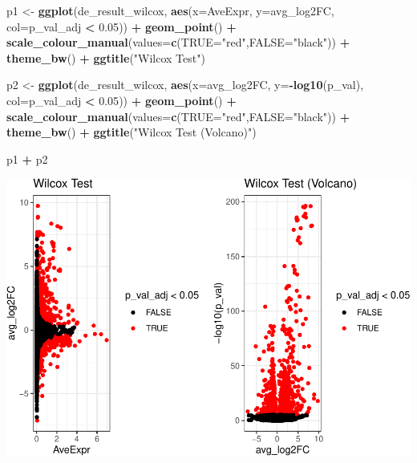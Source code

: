 \documentclass[
]{book}
\newenvironment{Shaded}{\begin{snugshade}}{\end{snugshade}}
\newcommand{\AttributeTok}[1]{\textcolor[rgb]{0.13,0.29,0.53}{#1}}
\newcommand{\FloatTok}[1]{\textcolor[rgb]{0.00,0.00,0.81}{#1}}
\newcommand{\FunctionTok}[1]{\textcolor[rgb]{0.13,0.29,0.53}{\textbf{#1}}}
\newcommand{\NormalTok}[1]{#1}
\newcommand{\OtherTok}[1]{\textcolor[rgb]{0.56,0.35,0.01}{#1}}
\newcommand{\SpecialCharTok}[1]{\textcolor[rgb]{0.81,0.36,0.00}{\textbf{#1}}}
\newcommand{\StringTok}[1]{\textcolor[rgb]{0.31,0.60,0.02}{#1}}
\begin{document}
\begin{Shaded}
\begin{Highlighting}[]
\NormalTok{p1 }\OtherTok{\textless{}{-}} \FunctionTok{ggplot}\NormalTok{(de\_result\_wilcox, }\FunctionTok{aes}\NormalTok{(}\AttributeTok{x=}\NormalTok{AveExpr, }\AttributeTok{y=}\NormalTok{avg\_log2FC, }\AttributeTok{col=}\NormalTok{p\_val\_adj }\SpecialCharTok{\textless{}} \FloatTok{0.05}\NormalTok{)) }\SpecialCharTok{+}
  \FunctionTok{geom\_point}\NormalTok{() }\SpecialCharTok{+}
  \FunctionTok{scale\_colour\_manual}\NormalTok{(}\AttributeTok{values=}\FunctionTok{c}\NormalTok{(}\StringTok{\textquotesingle{}TRUE\textquotesingle{}}\OtherTok{=}\StringTok{"red"}\NormalTok{,}\StringTok{\textquotesingle{}FALSE\textquotesingle{}}\OtherTok{=}\StringTok{"black"}\NormalTok{)) }\SpecialCharTok{+} 
  \FunctionTok{theme\_bw}\NormalTok{() }\SpecialCharTok{+}
  \FunctionTok{ggtitle}\NormalTok{(}\StringTok{"Wilcox Test"}\NormalTok{)}


\NormalTok{p2 }\OtherTok{\textless{}{-}} \FunctionTok{ggplot}\NormalTok{(de\_result\_wilcox, }\FunctionTok{aes}\NormalTok{(}\AttributeTok{x=}\NormalTok{avg\_log2FC, }\AttributeTok{y=}\SpecialCharTok{{-}}\FunctionTok{log10}\NormalTok{(p\_val), }\AttributeTok{col=}\NormalTok{p\_val\_adj }\SpecialCharTok{\textless{}} \FloatTok{0.05}\NormalTok{)) }\SpecialCharTok{+}
  \FunctionTok{geom\_point}\NormalTok{() }\SpecialCharTok{+}
  \FunctionTok{scale\_colour\_manual}\NormalTok{(}\AttributeTok{values=}\FunctionTok{c}\NormalTok{(}\StringTok{\textquotesingle{}TRUE\textquotesingle{}}\OtherTok{=}\StringTok{"red"}\NormalTok{,}\StringTok{\textquotesingle{}FALSE\textquotesingle{}}\OtherTok{=}\StringTok{"black"}\NormalTok{)) }\SpecialCharTok{+} 
  \FunctionTok{theme\_bw}\NormalTok{() }\SpecialCharTok{+}
  \FunctionTok{ggtitle}\NormalTok{(}\StringTok{"Wilcox Test (Volcano)"}\NormalTok{)}

\NormalTok{p1 }\SpecialCharTok{+}\NormalTok{ p2}
\end{Highlighting}
\end{Shaded}

\includegraphics{scRNAseqInR_Doco_files/figure-latex/unnamed-chunk-54-1.pdf}
\end{document}

